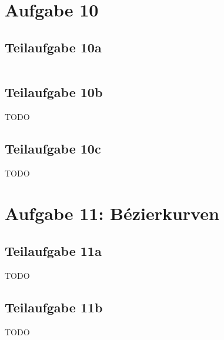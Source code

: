 \documentclass[a4paper]{scrartcl}
\begin{document}
\section*{Aufgabe 10}
\subsection*{Teilaufgabe 10a}
\inputminted[linenos, numbersep=5pt, tabsize=4, frame=lines, label=shader.frag]{glsl}{shader.frag}

\subsection*{Teilaufgabe 10b}
TODO

\subsection*{Teilaufgabe 10c}
TODO

\section*{Aufgabe 11: Bézierkurven}
\subsection*{Teilaufgabe 11a}
TODO
\subsection*{Teilaufgabe 11b}
TODO
\end{document}

